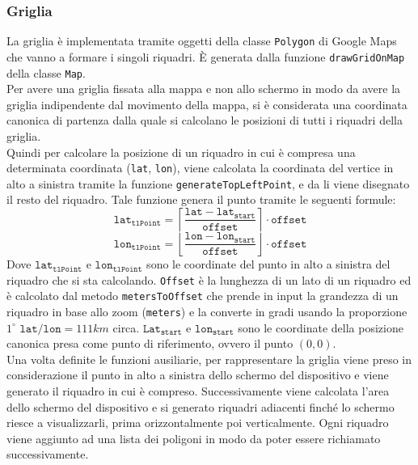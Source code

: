 \documentclass[11pt]{article}
\begin{document}
\subsubsection{Griglia}
La griglia è implementata tramite oggetti della classe \texttt{Polygon} di Google Maps che vanno a formare i singoli riquadri. È generata dalla funzione \texttt{drawGridOnMap} della classe \texttt{Map}.\\
Per avere una griglia fissata alla mappa e non allo schermo in modo da avere la griglia indipendente dal movimento della mappa, si è considerata una coordinata canonica di partenza dalla quale si calcolano le posizioni di tutti i riquadri della griglia. \\
Quindi per calcolare la posizione di un riquadro in cui è compresa una determinata coordinata (\texttt{lat}, \texttt{lon}), viene calcolata la coordinata del vertice in alto a sinistra tramite la funzione \texttt{generateTopLeftPoint}, e da li viene disegnato il resto del riquadro. Tale funzione genera il punto tramite le seguenti formule:
\begin{equation*}
    \texttt{lat}_{\texttt{tlPoint}} = \left \lceil \dfrac{\texttt{lat} - \texttt{lat}_{\texttt{start}}}{\texttt{offset}} \right \rceil \cdot \texttt{offset}
\end{equation*}
\begin{equation*}
    \texttt{lon}_{\texttt{tlPoint}} = \left \lfloor \dfrac{\texttt{lon} - \texttt{lon}_{\texttt{start}}}{\texttt{offset}} \right \rfloor \cdot \texttt{offset}
\end{equation*}
Dove $\texttt{lat}_{\texttt{tlPoint}}$ e $\texttt{lon}_{\texttt{tlPoint}}$ sono le coordinate del punto in alto a sinistra del riquadro che si sta calcolando. \texttt{Offset} è la lunghezza di un lato di un riquadro ed è calcolato dal metodo \texttt{metersToOffset} che prende in input la grandezza di un riquadro in base allo zoom (\texttt{meters}) e la converte in gradi usando la proporzione $1^{\circ} \texttt{ lat}/\texttt{lon} = 111km$ circa. $\texttt{Lat}_{\texttt{start}}$ e $\texttt{lon}_{\texttt{start}}$ sono le coordinate della posizione canonica presa come punto di riferimento, ovvero il punto $(0,0)$. \\
Una volta definite le funzioni ausiliarie, per rappresentare la griglia viene preso in considerazione il punto in alto a sinistra dello schermo del dispositivo e viene generato il riquadro in cui è compreso. Successivamente viene calcolata l'area dello schermo del dispositivo e si generato riquadri adiacenti finché lo schermo riesce a visualizzarli, prima orizzontalmente poi verticalmente. Ogni riquadro viene aggiunto ad una lista dei poligoni in modo da poter essere richiamato successivamente.\\
\end{document}
